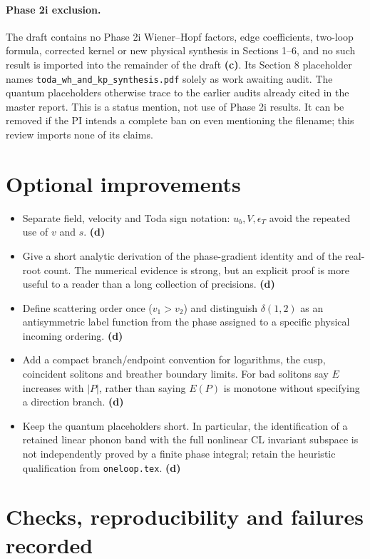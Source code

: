 \documentclass[11pt,a4paper]{article}
\newcommand{\C}{\textsf{\textbf{(c)}}}
\newcommand{\D}{\textsf{\textbf{(d)}}}
\newcommand{\file}[1]{\nolinkurl{#1}}
\begin{document}
\paragraph{Phase 2i exclusion.}
The draft contains no Phase 2i Wiener--Hopf factors, edge coefficients,
two-loop formula, corrected kernel or new physical synthesis in Sections
1--6, and no such result is imported into the remainder of the draft \C.
Its Section 8 placeholder names \file{toda_wh_and_kp_synthesis.pdf} solely
as work awaiting audit. The quantum placeholders otherwise trace to the
earlier audits already cited in the master report. This is a status mention,
not use of Phase 2i results. It can be removed if the PI intends a complete
ban on even mentioning the filename; this review imports none of its claims.

\section*{Optional improvements}
\begin{itemize}[leftmargin=*]
\item Separate field, velocity and Toda sign notation: $u_b,V,\epsilon_T$
avoid the repeated use of $v$ and $s$. \D
\item Give a short analytic derivation of the phase-gradient identity and
of the real-root count. The numerical evidence is strong, but an explicit
proof is more useful to a reader than a long collection of precisions. \D
\item Define scattering order once ($v_1>v_2$) and distinguish
$\delta(1,2)$ as an antisymmetric label function from the phase assigned
to a specific physical incoming ordering. \D
\item Add a compact branch/endpoint convention for logarithms, the cusp,
coincident solitons and breather boundary limits. For bad solitons say
$E$ increases with $|P|$, rather than saying $E(P)$ is monotone without
specifying a direction branch. \D
\item Keep the quantum placeholders short. In particular, the identification
of a retained linear phonon band with the full nonlinear CL invariant
subspace is not independently proved by a finite phase integral; retain
the heuristic qualification from \file{oneloop.tex}. \D
\end{itemize}

\section*{Checks, reproducibility and failures recorded}
\end{document}
